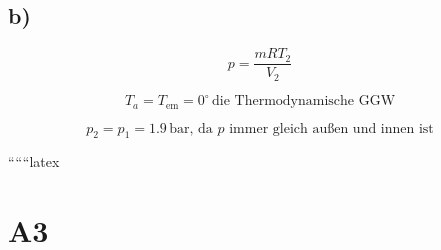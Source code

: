 

\subsection*{b)}

\[
p = \frac{mRT_2}{V_2}
\]

\[
T_a = T_{\text{em}} = 0^\circ \, \text{die Thermodynamische GGW}
\]

\[
p_2 = p_1 = 1.9 \, \text{bar}, \, \text{da } p \text{ immer gleich außen und innen ist}
\]

``````latex


\section*{A3}